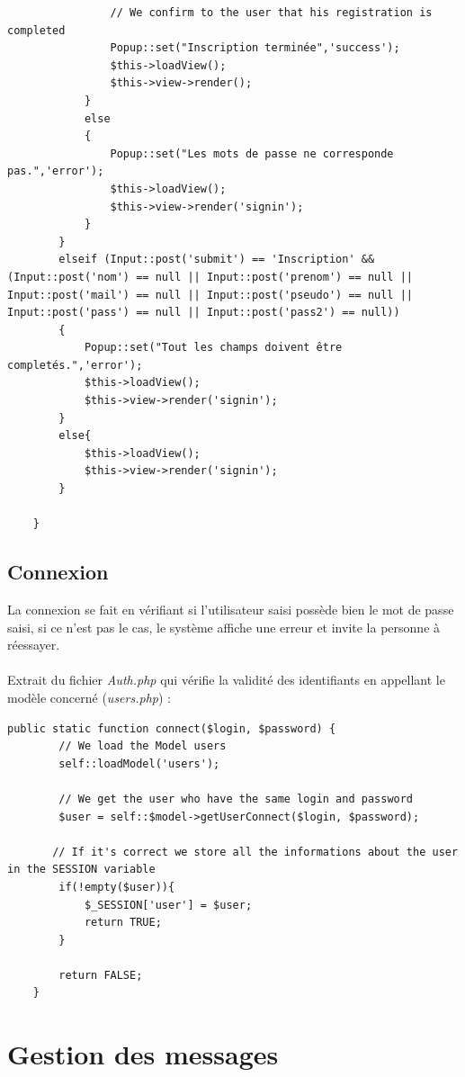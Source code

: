 \documentclass[12pt,a4paper]{report}
\begin{document}
\begin{itemize}
\begin{lstlisting}
                // We confirm to the user that his registration is completed
                Popup::set("Inscription terminée",'success');
                $this->loadView();
                $this->view->render();
            }
            else
            {
                Popup::set("Les mots de passe ne corresponde pas.",'error');
                $this->loadView();
                $this->view->render('signin');
            }
        }
        elseif (Input::post('submit') == 'Inscription' && (Input::post('nom') == null || Input::post('prenom') == null || Input::post('mail') == null || Input::post('pseudo') == null || Input::post('pass') == null || Input::post('pass2') == null))
        {
            Popup::set("Tout les champs doivent être completés.",'error');
            $this->loadView();
            $this->view->render('signin');
        }
        else{
            $this->loadView();
            $this->view->render('signin');
        }

    }
\end{lstlisting}
\clearpage
\subsection{Connexion}
La connexion se fait en vérifiant si l'utilisateur saisi possède bien le mot de passe saisi, si ce n'est pas le cas, le système affiche une erreur et invite la personne à réessayer.
\paragraph{}
Extrait du fichier \textit{Auth.php} qui vérifie la validité des identifiants en appellant le modèle concerné (\textit{users.php}) :

\lstset{}
\begin{lstlisting}
public static function connect($login, $password) {
        // We load the Model users       
        self::loadModel('users');
        
        // We get the user who have the same login and password
        $user = self::$model->getUserConnect($login, $password);
       
       // If it's correct we store all the informations about the user in the SESSION variable
        if(!empty($user)){
            $_SESSION['user'] = $user;
            return TRUE;
        }
        
        return FALSE;
    }
\end{lstlisting}
\section{Gestion des messages}


\end{itemize}
\end{document}
